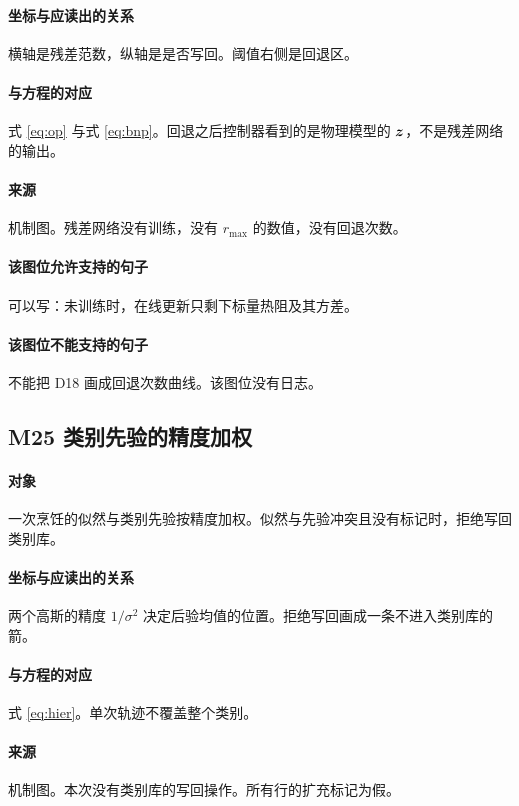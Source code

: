\paragraph{坐标与应读出的关系}
横轴是残差范数，纵轴是是否写回。阈值右侧是回退区。

\paragraph{与方程的对应}
式 \eqref{eq:op} 与式 \eqref{eq:bnp}。回退之后控制器看到的是物理模型的 $\bm{z}$，不是残差网络的输出。

\paragraph{来源}
机制图。残差网络没有训练，没有 $r_{\max}$ 的数值，没有回退次数。

\paragraph{该图位允许支持的句子}
可以写：未训练时，在线更新只剩下标量热阻及其方差。

\paragraph{该图位不能支持的句子}
不能把 D18 画成回退次数曲线。该图位没有日志。

\subsection{M25 类别先验的精度加权}
\paragraph{对象}
一次烹饪的似然与类别先验按精度加权。似然与先验冲突且没有标记时，拒绝写回类别库。

\paragraph{坐标与应读出的关系}
两个高斯的精度 $1/\sigma^2$ 决定后验均值的位置。拒绝写回画成一条不进入类别库的箭。

\paragraph{与方程的对应}
式 \eqref{eq:hier}。单次轨迹不覆盖整个类别。

\paragraph{来源}
机制图。本次没有类别库的写回操作。所有行的扩充标记为假。

